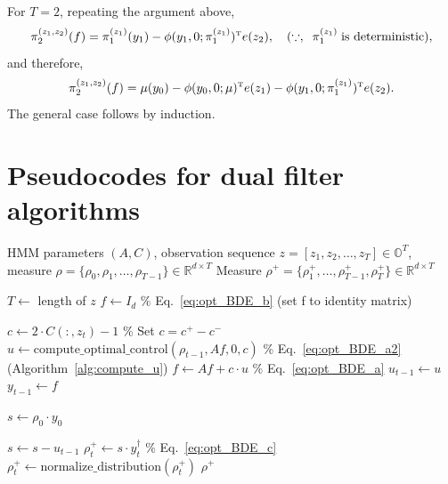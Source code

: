\documentclass[twoside,11pt]{article}
\def\Re{\mathbb{R}}
\newcommand{\field}[1]{\mathbb{#1}}
\def\Re{\field{R}}
\def\Re{\mathbb{R}}
\renewcommand{\Re}{\mathbb{R}}
\def\clN{{\cal N}}
\def\bO{\mathbb{O}}
\def\tp{{\hbox{\rm\tiny T}}}
\def\dfltr{{\text{\rm (dfltr)}}}
\begin{document}
For $T=2$, repeating
the argument above,
\begin{equation*}
\pi_2^{(z_1,z_2)}(f) = \pi_1^{(z_1)}(y_1) -
\phi(y_1,0;\pi_1^{(z_1)})^\tp e(z_2),\quad (\because,\;\;
\pi_1^{(z_1)} \;\text{is deterministic}),
\end{equation*}
and therefore,
\begin{equation*}
\pi_2^{(z_1,z_2)}(f) = \mu(y_0) - \phi(y_0,0;\mu)^\tp e(z_1) -
\phi(y_1,0;\pi_1^{(z_1)})^\tp e(z_2).
\end{equation*}
The general case follows by induction. 


\section{Pseudocodes for dual filter algorithms}
\label{appdx:algorithms}


\begin{algorithm}
  \caption{Dual filter $\clN^\dfltr$ (iterative)}
  \label{alg:dual_filter_iterative}
  \begin{algorithmic}[1]
  \REQUIRE HMM parameters $(A,C)$, observation sequence $z
  =[z_1,z_2,\hdots,z_T]\in\bO^T$, measure
  $\rho=\{\rho_0,\rho_1,\hdots,\rho_{T-1}\}\in \Re^{d\times T}$
  \ENSURE Measure $\rho^+ = \{\rho_1^+,\hdots,\rho_{T-1}^+,\rho_{T}^+\}\in \Re^{d\times T}$
  
  \STATE $T \gets$ length of $z$
  \STATE $f \gets I_d$ \hfill \% Eq.~\eqref{eq:opt_BDE_b} (set f to identity matrix)
  
      \STATE $c \gets 2 \cdot C(:,z_{t}) - 1$ \hfill \% Set $c= c^+-c^-$
      \STATE $u \gets \text{compute\_optimal\_control}(\rho_{t-1}, {A}
      f, 0, c)$ \hfill \% Eq.~\eqref{eq:opt_BDE_a2} (Algorithm~\ref{alg:compute_u})
      \STATE $f \gets A f + c \cdot u$ \hfill \% Eq.~\eqref{eq:opt_BDE_a}
      \STATE $u_{t-1} \gets u$
      \STATE $y_{t-1} \gets f$
  \ENDFOR
  
  \STATE $s \gets  \rho_0 \cdot y_0$
  
  \STATE $s \gets  s - u_{t-1}$
  \STATE $\rho^+_t \gets s \cdot y_t^{\dagger}$ \hfill \% Eq.~\eqref{eq:opt_BDE_c}
  \STATE $\rho^+_t \gets \text{normalize\_distribution}(\rho_t^+)$
  \ENDFOR
  \RETURN $\rho^+$
  
  \end{algorithmic}
\end{algorithm}
\end{document}
